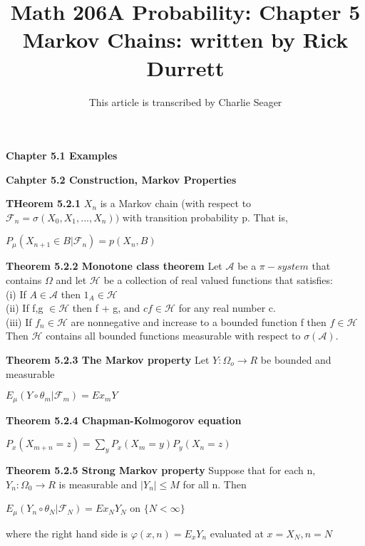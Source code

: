 \documentclass{article}
\begin{document}
\title{Math 206A Probability: Chapter 5 Markov Chains: written by Rick Durrett}
\author{This article is transcribed by Charlie Seager}

\maketitle

\textbf {Chapter 5.1 Examples}

\textbf {Cahpter 5.2 Construction, Markov Properties}

\textbf {THeorem 5.2.1} $X_n$ is a Markov chain (with respect to $\mathcal{F}_n = \sigma(X_0, X_1 ,..., X_n))$ with transition probability p. That is,
\begin{center}
$P_\mu(X_{n+1} \in B | \mathcal{F}_n) = p(X_n, B)$
\end{center}

\textbf {Theorem 5.2.2 Monotone class theorem} Let $\mathcal{A}$ be a $\pi-system$ that contains $\Omega$ and let $\mathcal{H}$ be a collection of real valued functions that satisfies: \\
(i) If $A \in \mathcal{A}$ then $1_A \in \mathcal{H}$ \\
(ii) If f,g $\in \mathcal{H}$ then f + g, and $c f \in \mathcal{H}$ for any real number c. \\
(iii) If $f_n \in \mathcal{H}$ are nonnegative and increase to a bounded function f then $f \in \mathcal{H}$ \\
Then $\mathcal{H}$ contains all bounded functions measurable with respect to $\sigma(\mathcal{A})$.

\textbf {Theorem 5.2.3 The Markov property} Let $Y : \Omega_o \to R$ be bounded and measurable
\begin{center}
$E_\mu (Y \circ \theta_m |\mathcal{F}_m) = Ex_m Y$
\end{center}

\textbf {Theorem 5.2.4 Chapman-Kolmogorov equation}
\begin{center}
$P_x (X_{m+n} = z) = \sum_y P_x(X_m = y) P_y(X_n = z)$
\end{center}

\textbf {Theorem 5.2.5 Strong Markov property} Suppose that for each n, $Y_n : \Omega_0 \to R$ is measurable and $|Y_n| \leq M$ for all n. Then
\begin{center}
$E_\mu (Y_n \circ \theta_N|\mathcal{F}_N) = Ex_N Y_N$ on $\{N < \infty \}$
\end{center}
where the right hand side is $\varphi(x,n) = E_x Y_n$ evaluated at $x = X_N, n = N$
\end{document}
